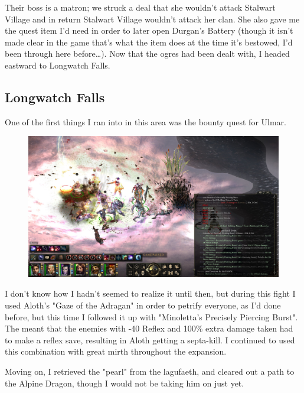 \documentclass{article}
\begin{document}
Their boss is a matron; we struck a deal that she wouldn't attack Stalwart Village and in return Stalwart Village wouldn't attack her clan.  She also gave me the quest item I'd need in order to later open Durgan's Battery (though it isn't made clear in the game that's what the item does at the time it's bestowed, I'd been through here before\ldots).  Now that the ogres had been dealt with, I headed eastward to Longwatch Falls.

\subsection{Longwatch Falls}
One of the first things I ran into in this area was the bounty quest for Ulmar.

\begin{figure}
\includegraphics[scale=0.33]{files/blog/2019_08_17_poe_potd_wmpt1/2019_08_17_longwatch_falls_1.jpg}
\end{figure}

I don't know how I hadn't seemed to realize it until then, but during this fight I used Aloth's "Gaze of the Adragan" in order to petrify everyone, as I'd done before, but this time I followed it up with "Minoletta's Precisely Piercing Burst".  The meant that the enemies with -40 Reflex and 100\% extra damage taken had to make a reflex save, resulting in Aloth getting a septa-kill.  I continued to used this combination with great mirth throughout the expansion.

Moving on, I retrieved the "pearl" from the lagufaeth, and cleared out a path to the Alpine Dragon, though I would not be taking him on just yet.
\end{document}
